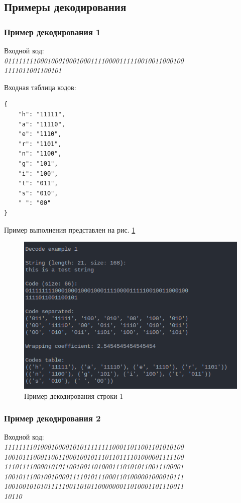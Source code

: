 \subsection{Примеры декодирования}


\subsubsection*{Пример декодирования 1}

Входной код:\\ 
\textit{
01111111100010001000100011110000111110010011000100\\
1111011001100101
}

Входная таблица кодов:\\ 
\begin{lstlisting}
{
    "h": "11111",
    "a": "11110",
    "e": "1110",
    "r": "1101",
    "n": "1100",
    "g": "101",
    "i": "100",
    "t": "011",
    "s": "010",
    " ": "00"
}
\end{lstlisting}

Пример выполнения представлен на рис. \ref{fig:decode_example_1}

\begin{figure}[H]
    \centering
    \includegraphics[width=0.7\linewidth]{photo/decode_example_1}
    \caption{Пример декодирования строки 1}
    \label{fig:decode_example_1}
\end{figure}

\subsubsection*{Пример декодирования 2}

Входной код:\\ 
\textit{
11111111010001000010101111111100011011001101010100\\
10010111000110011000100101110110111101000001111100\\
11101111000010101100100110100011101010110011100001\\
10010111001001000011110101110001101000001000010111\\
10010010101011111001101011000000011010001101110011\\
10110
}

